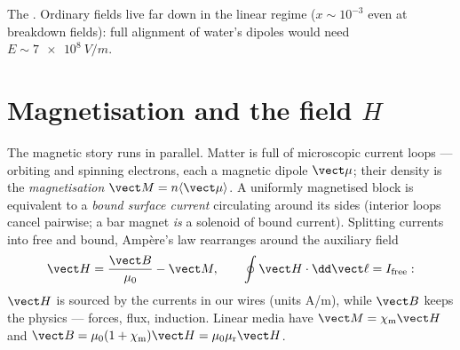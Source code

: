 \begin{omfigure}

{\small The . Ordinary fields live far down in the
linear regime ($x \sim 10^{-3}$ even at breakdown fields): full
alignment of water's dipoles would need
$E \sim \qty{7e8}{V/m}$.}
\end{omfigure}

\section{Magnetisation and the field \texorpdfstring{$H$}{H}}

\begin{definition}\label{def:b3:electromagnetism-in-matter:magnetisation}
The magnetic story runs in parallel. Matter is full of microscopic
current loops --- orbiting and spinning electrons, each a magnetic
dipole $\vect\mu$; their density is the \emph{magnetisation}
$\vect M = n\langle\vect\mu\rangle$. A uniformly magnetised block is
equivalent to a \emph{bound surface current} circulating around its
sides (interior loops cancel pairwise; a bar magnet \emph{is} a
solenoid of bound current). Splitting currents into free and bound,
Ampère's law rearranges around the auxiliary field
\[
\vect H = \frac{\vect B}{\mu_0} - \vect M , \qquad
\oint \vect H\cdot\dd\vect\ell = I_{\text{free}} :
\]
$\vect H$ is sourced by the currents in our wires (units
\unit{A/m}), while $\vect B$ keeps the physics --- forces, flux,
induction. Linear media have $\vect M = \chi_{\text{m}}\vect H$ and
$\vect B = \mu_0(1 + \chi_{\text{m}})\vect H =
\mu_0\mu_{\text{r}}\vect H$.
\end{definition}

